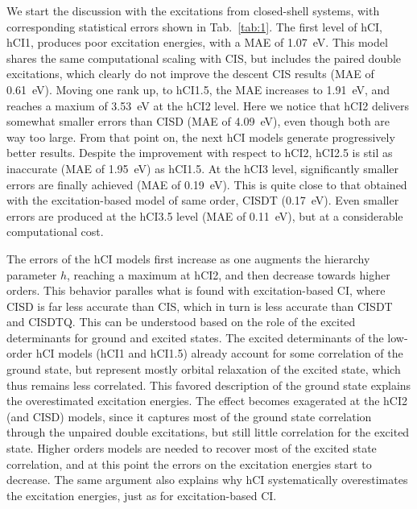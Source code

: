 \documentclass[aip,jcp,reprint,noshowkeys,superscriptaddress]{revtex4-1}
\begin{document}

We start the discussion with the excitations from closed-shell systems, with corresponding statistical errors shown in Tab.~\ref{tab:1}.
%
The first level of hCI, hCI1, produces poor excitation energies, with a MAE of \SI{1.07}{\eV}.
This model shares the same computational scaling with CIS, but includes the paired double excitations, 
which clearly do not improve the descent CIS results (MAE of \SI{0.61}{\eV}).
Moving one rank up, to hCI1.5, the MAE increases to \SI{1.91}{\eV}, and reaches a maxium of \SI{3.53}{\eV} at the hCI2 level.
Here we notice that hCI2 delivers somewhat smaller errors than CISD (MAE of \SI{4.09}{\eV}), even though both are way too large.
From that point on, the next hCI models generate progressively better results.
Despite the improvement with respect to hCI2, hCI2.5 is stil as inaccurate (MAE of \SI{1.95}{\eV}) as hCI1.5.
At the hCI3 level, significantly smaller errors are finally achieved (MAE of \SI{0.19}{\eV}).
This is quite close to that obtained with the excitation-based model of same order, CISDT (\SI{0.17}{\eV}).
Even smaller errors are produced at the hCI3.5 level (MAE of \SI{0.11}{\eV}), but at a considerable computational cost.


The errors of the hCI models first increase as one augments the hierarchy parameter $h$, reaching a maximum at hCI2, and then decrease towards higher orders.
This behavior paralles what is found with excitation-based CI, where CISD is far less accurate than CIS, which in turn is less accurate than CISDT and CISDTQ.
This can be understood based on the role of the excited determinants for ground and excited states.
The excited determinants of the low-order hCI models (hCI1 and hCI1.5) already account for some correlation of the ground state,
but represent mostly orbital relaxation of the excited state, which thus remains less correlated.
This favored description of the ground state explains the overestimated excitation energies.
The effect becomes exagerated at the hCI2 (and CISD) models, since it captures most of the ground state correlation through the unpaired double excitations,
but still little correlation for the excited state.
Higher orders models are needed to recover most of the excited state correlation, and at this point the errors on the excitation energies start to decrease.
The same argument also explains why hCI systematically overestimates the excitation energies, just as for excitation-based CI.
\end{document}
